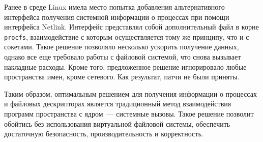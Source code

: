 Ранее в среде Linux имела место попытка добавления альтернативного интерфейса
получения системной информации о процессах при помощи интерфейса
Netlink\cite{vagin}. Интерфейс представлял собой дополнительный файл в корне
\texttt{procfs}, взаимодействие с которым осуществляется тому же принципу, что и
с сокетами. Такое решение позволяло несколько ускорить получение данных, однако
все еще требовало работы с файловой системой, что снова вызывает накладные
расходы. Кроме того, предложенное решение игнорировало любые пространства имен,
кроме сетевого. Как результат, патчи не были приняты.

Таким образом, оптимальным решением для получения информации о процессах и
файловых дескрипторах является традиционный метод взаимодействия программ
пространства с ядром~--- системные вызовы\cite{man_syscall}. Такое решение
позволит обойтись без использования виртуальной файловой системы, обеспечить
достаточную безопасность, производительность и корректность.

\nocite{lkml}
